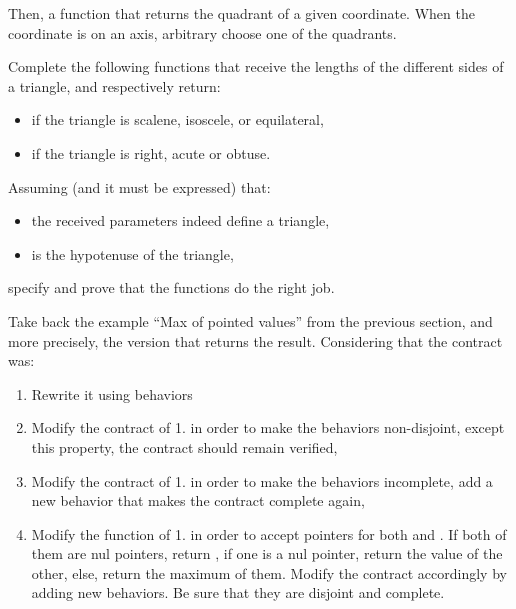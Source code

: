 

Then, a function that returns the quadrant of a given coordinate. When
the coordinate is on an axis, arbitrary choose one of the quadrants.






Complete the following functions that receive the lengths of the different
sides of a triangle, and respectively return:

\begin{itemize}
\item if the triangle is scalene, isoscele, or equilateral,
\item if the triangle is right, acute or obtuse.
\end{itemize}




Assuming (and it must be expressed) that:


\begin{itemize}
\item the received parameters indeed define a triangle,
\item {} is the hypotenuse of the triangle,
\end{itemize}


specify and prove that the functions do the right job.




Take back the example ``Max of pointed values'' from the previous section,
and more precisely, the version that returns the result. Considering that
the contract was:






\begin{enumerate}
\item Rewrite it using behaviors
\item Modify the contract of 1. in order to make the behaviors non-disjoint,
  except this property, the contract should remain verified,
\item Modify the contract of 1. in order to make the behaviors incomplete,
  add a new behavior that makes the contract complete again,
\item Modify the function of 1. in order to accept  pointers
  for both  and . If both of them are nul pointers,
  return , if one is a nul pointer, return the value of
  the other, else, return the maximum of them. Modify the contract accordingly
  by adding new behaviors. Be sure that they are disjoint and complete.
\end{enumerate}


